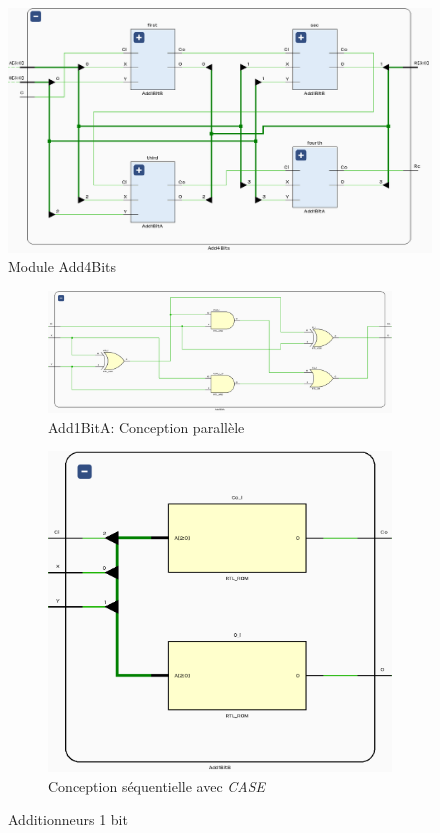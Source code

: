 \begin{figure}[H]
	\centering
	\includegraphics[width=.6\textwidth]{assets/img/schematic-add4bits.png}
	\caption{Module Add4Bits}
\end{figure}

\begin{figure}[H]
	\centering
	\begin{subfigure}{0.60 \linewidth}
		\centering
		\vfill
		\includegraphics[width=\textwidth]{assets/img/schematic-add1bita.png}
		\caption{Add1BitA: Conception parallèle}
	\end{subfigure} \hfill
	\begin{subfigure}{0.39 \linewidth}
		\centering
		\includegraphics[width=\textwidth]{assets/img/schematic-add1bitb.png}
		\caption{Conception séquentielle avec \textit{CASE}}
	\end{subfigure}
	\caption{Additionneurs 1 bit}
\end{figure}


